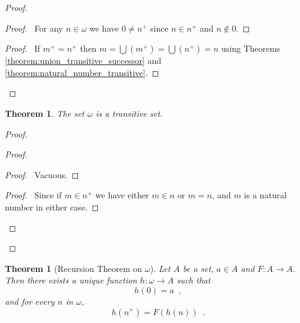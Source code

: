 \documentclass{article}
\let\qed\relax
\newtheorem{theorem}[axiom]{Theorem}
\theoremstyle{definition}
\newcommand{\ran}{\ensuremath{\operatorname{ran}}}
\begin{document}
    \begin{proof}
        \pf
        \step{1}{$0 \notin \ran \sigma$}
        \begin{proof}
            \pf\ For any $n \in \omega$ we have $0 \neq n^+$ since $n \in n^+$
            and $n \notin 0$.
        \end{proof}
        \begin{proof}
            \pf\ If $m^+ = n^+$ then $m = \bigcup (m^+) = \bigcup (n^+) = n$ using Theorems
            \ref{theorem:union_transitive_successor} and \ref{theorem:natural_number_transitive}.
        \end{proof}
        \qed
    \end{proof}

    \begin{theorem}
        The set $\omega$ is a transitive set.
    \end{theorem}

    \begin{proof}
        \pf
        \begin{proof}
            \begin{proof}
                \pf\ Vacuous.
            \end{proof}
            \begin{proof}
                \pf\ Since if $m \in n^+$ we have either $m \in n$ or $m = n$, and $m$ is a natural number
                in either case.
            \end{proof}
        \end{proof}
        \qed
    \end{proof}

    \begin{theorem}[Recursion Theorem on $\omega$]
        Let $A$ be a set, $a \in A$ and $F : A \rightarrow A$. Then there exists a unique function
        $h : \omega \rightarrow A$ such that
        \[ h(0) = a \enspace , \]
        and for every $n$ in $\omega$,
        \[ h(n^+) = F(h(n)) \enspace . \]
    \end{theorem}
\end{document}
